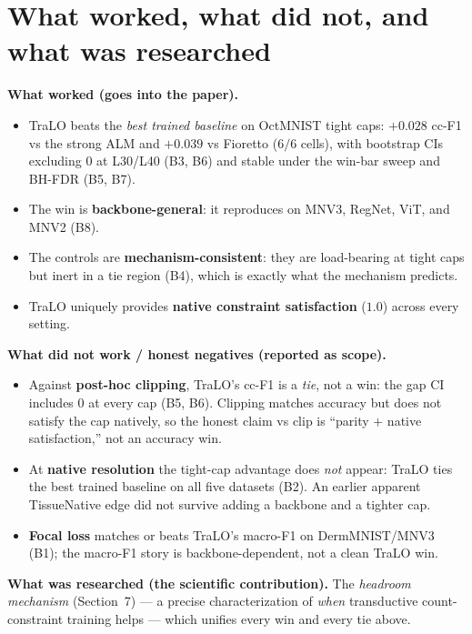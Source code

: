 \documentclass[11pt,a4paper]{article}
\begin{document}
\section{What worked, what did not, and what was researched}
\textbf{What worked (goes into the paper).}
\begin{itemize}
\item TraLO beats the \emph{best trained baseline} on OctMNIST tight caps: $+0.028$ cc-F1 vs the strong ALM and
$+0.039$ vs Fioretto ($6/6$ cells), with bootstrap CIs excluding $0$ at L30/L40 (B3, B6) and stable under the
win-bar sweep and BH-FDR (B5, B7).
\item The win is \textbf{backbone-general}: it reproduces on MNV3, RegNet, ViT, and MNV2 (B8).
\item The controls are \textbf{mechanism-consistent}: they are load-bearing at tight caps but inert in a tie
region (B4), which is exactly what the mechanism predicts.
\item TraLO uniquely provides \textbf{native constraint satisfaction} ($1.0$) across every setting.
\end{itemize}
\textbf{What did not work / honest negatives (reported as scope).}
\begin{itemize}
\item Against \textbf{post-hoc clipping}, TraLO's cc-F1 is a \emph{tie}, not a win: the gap CI includes $0$ at
every cap (B5, B6). Clipping matches accuracy but does not satisfy the cap natively, so the honest claim vs
clip is ``parity $+$ native satisfaction,'' not an accuracy win.
\item At \textbf{native resolution} the tight-cap advantage does \emph{not} appear: TraLO ties the best trained
baseline on all five datasets (B2). An earlier apparent TissueNative edge did not survive adding a backbone and
a tighter cap.
\item \textbf{Focal loss} matches or beats TraLO's macro-F1 on DermMNIST/MNV3 (B1); the macro-F1 story is
backbone-dependent, not a clean TraLO win.
\end{itemize}
\textbf{What was researched (the scientific contribution).} The \emph{headroom mechanism} (Section~7) --- a
precise characterization of \emph{when} transductive count-constraint training helps --- which unifies every
win and every tie above.

\end{document}
